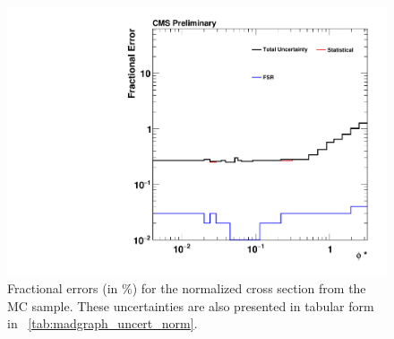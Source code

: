 \begin{figure}[!htbp]
    \centering
    \includegraphics[width=\textwidth]{figures/madgraph_uncertainty_normalized.pdf}
    \caption[
        Fractional errors (in \%) for the normalized cross section from the
        \MADGRAPH MC sample.
    ]{
        Fractional errors (in \%) for the normalized cross section from the
        \MADGRAPH MC sample. These uncertainties are also presented in tabular
        form in \TAB~\ref{tab:madgraph_uncert_norm}.
    }
    \label{fig:madgraph_uncert_norm}
\end{figure}
